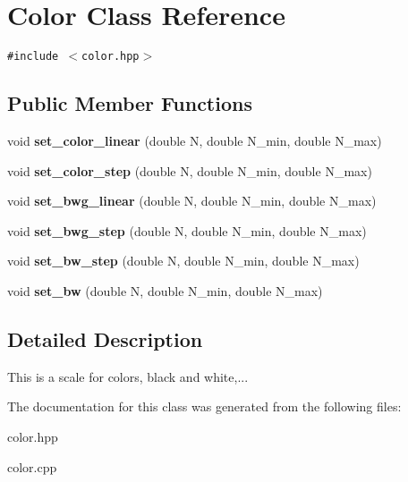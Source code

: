 \section{Color Class Reference}
\label{classColor}
{\tt \#include $<$color.hpp$>$}

\subsection*{Public Member Functions}
\begin{CompactItemize}
\item 
void {\bf set\_\-color\_\-linear} (double N, double N\_\-min, double N\_\-max)\label{classColor_a1}

\item 
void {\bf set\_\-color\_\-step} (double N, double N\_\-min, double N\_\-max)\label{classColor_a2}

\item 
void {\bf set\_\-bwg\_\-linear} (double N, double N\_\-min, double N\_\-max)\label{classColor_a3}

\item 
void {\bf set\_\-bwg\_\-step} (double N, double N\_\-min, double N\_\-max)\label{classColor_a4}

\item 
void {\bf set\_\-bw\_\-step} (double N, double N\_\-min, double N\_\-max)\label{classColor_a5}

\item 
void {\bf set\_\-bw} (double N, double N\_\-min, double N\_\-max)\label{classColor_a6}

\end{CompactItemize}


\subsection{Detailed Description}
This is a scale for colors, black and white,... 



The documentation for this class was generated from the following files:\begin{CompactItemize}
\item 
color.hpp\item 
color.cpp\end{CompactItemize}
